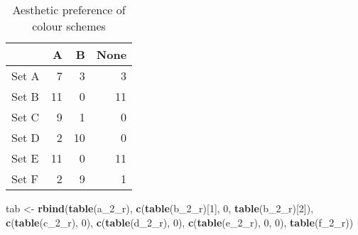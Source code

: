 \documentclass[
]{article}
\newenvironment{Shaded}{\begin{snugshade}}{\end{snugshade}}
\newcommand{\DataTypeTok}[1]{\textcolor[rgb]{0.13,0.29,0.53}{#1}}
\newcommand{\DecValTok}[1]{\textcolor[rgb]{0.00,0.00,0.81}{#1}}
\newcommand{\KeywordTok}[1]{\textcolor[rgb]{0.13,0.29,0.53}{\textbf{#1}}}
\newcommand{\NormalTok}[1]{#1}
\newcommand{\OperatorTok}[1]{\textcolor[rgb]{0.81,0.36,0.00}{\textbf{#1}}}
\newcommand{\StringTok}[1]{\textcolor[rgb]{0.31,0.60,0.02}{#1}}
\begin{document}
\begin{Shaded}
\end{Shaded}

\begin{table}[!h]

\caption{\label{tab:unnamed-chunk-52}Aesthetic preference of colour schemes}
\centering
\begin{tabular}[t]{l|r|r|r}
\hline
  & A & B & None\\
\hline
Set A & 7 & 3 & 3\\
\hline
Set B & 11 & 0 & 11\\
\hline
Set C & 9 & 1 & 0\\
\hline
Set D & 2 & 10 & 0\\
\hline
Set E & 11 & 0 & 11\\
\hline
Set F & 2 & 9 & 1\\
\hline
\end{tabular}
\end{table}

\begin{Shaded}
\begin{Highlighting}[]
\NormalTok{tab <-}\StringTok{ }\KeywordTok{rbind}\NormalTok{(}\KeywordTok{table}\NormalTok{(a_}\DecValTok{2}\NormalTok{_r), }\KeywordTok{c}\NormalTok{(}\KeywordTok{table}\NormalTok{(b_}\DecValTok{2}\NormalTok{_r)[}\DecValTok{1}\NormalTok{], }\DecValTok{0}\NormalTok{, }\KeywordTok{table}\NormalTok{(b_}\DecValTok{2}\NormalTok{_r)[}\DecValTok{2}\NormalTok{]), }\KeywordTok{c}\NormalTok{(}\KeywordTok{table}\NormalTok{(c_}\DecValTok{2}\NormalTok{_r), }\DecValTok{0}\NormalTok{), }\KeywordTok{c}\NormalTok{(}\KeywordTok{table}\NormalTok{(d_}\DecValTok{2}\NormalTok{_r), }\DecValTok{0}\NormalTok{), }\KeywordTok{c}\NormalTok{(}\KeywordTok{table}\NormalTok{(e_}\DecValTok{2}\NormalTok{_r), }\DecValTok{0}\NormalTok{, }\DecValTok{0}\NormalTok{), }\KeywordTok{table}\NormalTok{(f_}\DecValTok{2}\NormalTok{_r))}
\end{Highlighting}
\end{Shaded}
\end{document}
